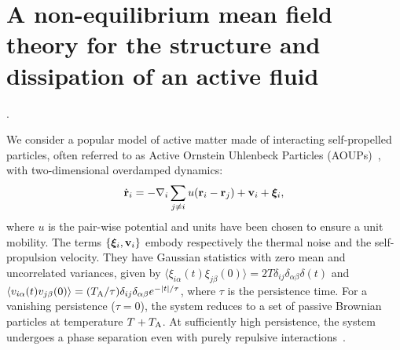 \documentclass[amsmath,preprintnumbers,10pt,nofootinbib,prl,twocolumn]{revtex4-1}
\newcommand{\T}{\text{T}}
\newcommand{\U}{\text{U}}
\begin{document}
\section{A non-equilibrium mean field theory for the structure and dissipation of an active fluid}.

We consider a popular model of active matter made of interacting self-propelled particles, often referred to as Active Ornstein Uhlenbeck Particles (AOUPs)~\cite{Szamel2014, Maggi2015, Nardini2016}, with two-dimensional overdamped dynamics:
 \begin{equation}
	\dot{\bf r}_i = -\nabla_i \sum_{j\neq i} u({\bf r}_i-{\bf r}_j) + {\bf v}_i + {\boldsymbol\xi}_i ,
\end{equation}
 where $u$ is the pair-wise potential and units have been chosen to ensure a unit mobility. The terms $\{{\boldsymbol\xi}_i,{\bf v}_i\}$ embody respectively the thermal noise and the self-propulsion velocity. They have Gaussian statistics with zero mean and uncorrelated variances, given by $\langle\xi_{i\alpha}(t)\xi_{j\beta}(0)\rangle = 2T \delta_{ij}\delta_{\alpha\beta}\delta(t)$ and $\langle v_{i\alpha}(t)v_{j\beta}(0)\rangle = (T_{\rm A}/\tau) \delta_{ij}\delta_{\alpha\beta}e^{-|t|/\tau}$, where $\tau$ is the persistence time. For a vanishing persistence ($\tau=0$), the system reduces to a set of passive Brownian particles at temperature $T+T_{\rm A}$. At sufficiently high persistence, the system undergoes a phase separation even with purely repulsive interactions~\cite{Nardini2016, Maggi2020}. 


\end{document}

